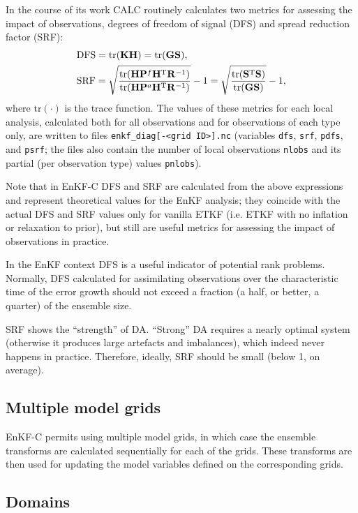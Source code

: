 \documentclass[11pt]{report}
\newcommand{\mb} {\mathbf}
\newcommand{\T}{^{\tiny \mathrm T}}
\begin{document}
In the course of its work CALC routinely calculates two metrics for assessing the impact of observations, degrees of freedom of signal (DFS) and spread reduction factor (SRF):
\begin{align*}
  & \mathrm{DFS} = \mathrm{tr}(\mb K \mb H) = \mathrm{tr}(\mb G \mb S), \\
  & \mathrm{SRF} = \sqrt{\frac{\mathrm{tr}(\mb H \mb P^f \mb H\T \mb R^{-1})}{\mathrm{tr}(\mb H \mb P^a \mb H\T \mb R^{-1})}} - 1 = \sqrt{\frac{\mathrm{tr}(\mb S\T \mb S)}{\mathrm{tr}(\mb G \mb S)}} - 1,
\end{align*}
where $\mathrm{tr}(\cdot)$ is the trace function.
The values of these metrics for each local analysis, calculated both for all observations and for observations of each type only, are written to files \verb|enkf_diag[-<grid ID>].nc| (variables \verb|dfs|, \verb|srf|, \verb|pdfs|, and \verb|psrf|; the files also contain the number of local observations \verb|nlobs| and its partial (per observation type) values \verb|pnlobs|).

Note that in EnKF-C DFS and SRF are calculated from the above expressions and represent theoretical values for the EnKF analysis; they coincide with the actual DFS and SRF values only for vanilla ETKF (i.e. ETKF with no inflation or relaxation to prior), but still are useful metrics for assessing the impact of observations in practice.

In the EnKF context DFS is a useful indicator of potential rank problems.
Normally, DFS calculated for assimilating observations over the characteristic time of the error growth should not exceed a fraction (a half, or better, a quarter) of the ensemble size.

SRF shows the ``strength'' of DA.
``Strong'' DA requires a nearly optimal system (otherwise it produces large artefacts and imbalances), which indeed never happens in practice.
Therefore, ideally, SRF should be small (below 1, on average).

\subsection{Multiple model grids}

EnKF-C permits using multiple model grids, in which case the ensemble transforms are calculated sequentially for each of the grids.
These transforms are then used for updating the model variables defined on the corresponding grids.

\subsection{Domains}
\label{sec:domains}
\end{document}
